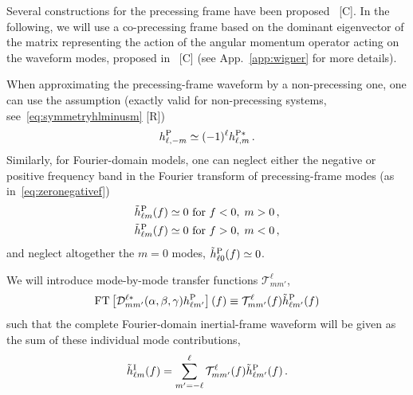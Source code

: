 \documentclass[aps,showpacs,twocolumn,
prd,superscriptaddress,nofootinbib]{revtex4-1}
\newcommand{\be}{\begin{equation}}
\newcommand{\ee}{\end{equation}}
\newcommand\calT{{\mathcal{T}}}
\newcommand\calD{{\mathcal{D}}}
\newcommand{\nn}{\nonumber}
\newcommand{\SM}[1]{{\color{Red} #1}}
\begin{document}
Several constructions for the precessing frame have been proposed~\cite{} \SM{[C]}. In the following, we will use a co-precessing frame based on the dominant eigenvector of the matrix representing the action of the angular momentum operator acting on the waveform modes, proposed in~\cite{} \SM{[C]} (see App.~\ref{app:wigner} for more details).

When approximating the precessing-frame waveform by a non-precessing one, one can use the assumption (exactly valid for non-precessing systems, see~\eqref{eq:symmetryhlminusm} \SM{[R]})
\be\label{eq:approxsymmetryhlminusm}
	h^{\rm P}_{\ell,-m} \simeq (-1)^{\ell} h^{\rm P*}_{\ell,m} \,.
\ee
Similarly, for Fourier-domain models, one can neglect either the negative or positive frequency band in the Fourier transform of precessing-frame modes (as in~\eqref{eq:zeronegativef})
\begin{align}\label{eq:approxzeronegativef}
	\tilde{h}_{\ell m}^{\rm P} (f) &\simeq 0 \text{ for } f<0, \; m>0 \nn\,,\\
	\tilde{h}_{\ell m}^{\rm P} (f) &\simeq 0 \text{ for } f>0, \; m<0 \,,
\end{align}
and neglect altogether the $m=0$ modes, $\tilde{h}_{\ell 0}^{\rm P} (f) \simeq 0$.

We will introduce mode-by-mode transfer functions $\calT^{\ell}_{mm'}$,
\be\label{eq:defprectransfer}
	\mathrm{FT} \left[ \calD^{\ell *}_{mm'} (\alpha,\beta,\gamma) h_{\ell m'}^{\rm P} \right] (f) \equiv \calT^{\ell}_{mm'}(f) \tilde{h}_{\ell m'}^{\rm P} (f)
\ee
such that the complete Fourier-domain inertial-frame waveform will be given as the sum of these individual mode contributions,
\be\label{eq:defprechIsum}
	\tilde{h}_{\ell m}^{\rm I} (f) = \sum\limits_{m'=-\ell}^{\ell} \calT^{\ell}_{mm'}(f) \tilde{h}_{\ell m'}^{\rm P} (f) \,.
\ee
\end{document}
